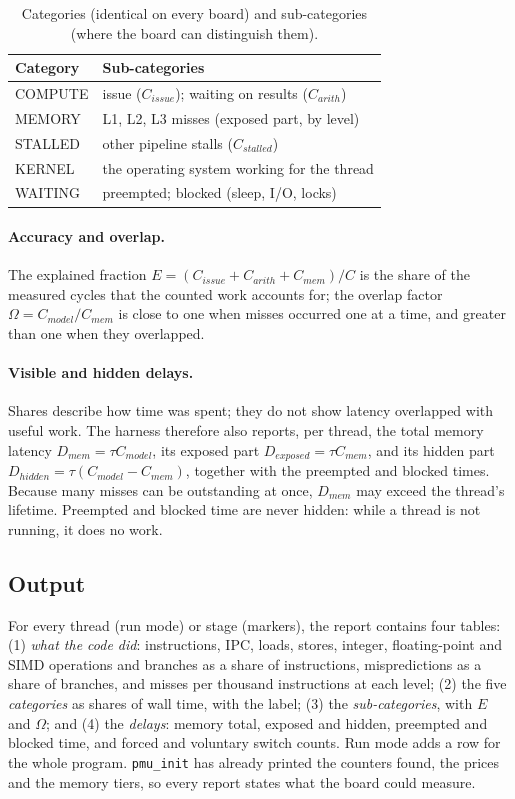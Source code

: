 \documentclass[10pt,a4paper,twocolumn]{article}
\newcommand{\code}[1]{\texttt{\small #1}}
\begin{document}
\begin{table}[t]
\centering\footnotesize
\caption{Categories (identical on every board) and sub-categories (where the board can distinguish them).}
\label{tab:cats}
\begin{tabularx}{\columnwidth}{|>{\raggedright\arraybackslash}p{1.45cm}|L|}
\hline
\textbf{Category} & \textbf{Sub-categories} \\ \hline
COMPUTE & issue ($C_{issue}$); waiting on results ($C_{arith}$) \\ \hline
MEMORY & L1, L2, L3 misses (exposed part, by level) \\ \hline
STALLED & other pipeline stalls ($C_{stalled}$) \\ \hline
KERNEL & the operating system working for the thread \\ \hline
WAITING & preempted; blocked (sleep, I/O, locks) \\ \hline
\end{tabularx}
\end{table}

\paragraph{Accuracy and overlap.} The explained fraction $E=(C_{issue}+C_{arith}+C_{mem})/C$ is the share of the measured cycles that the counted work accounts for; the overlap factor $\Omega=C_{model}/C_{mem}$ is close to one when misses occurred one at a time, and greater than one when they overlapped.

\paragraph{Visible and hidden delays.} Shares describe how time was spent; they do not show latency overlapped with useful work. The harness therefore also reports, per thread, the total memory latency $D_{mem}=\tau C_{model}$, its exposed part $D_{exposed}=\tau C_{mem}$, and its hidden part $D_{hidden}=\tau(C_{model}-C_{mem})$, together with the preempted and blocked times. Because many misses can be outstanding at once, $D_{mem}$ may exceed the thread's lifetime. Preempted and blocked time are never hidden: while a thread is not running, it does no work.

\subsection{Output}
For every thread (run mode) or stage (markers), the report contains four tables: (1) \emph{what the code did}: instructions, IPC, loads, stores, integer, floating-point and SIMD operations and branches as a share of instructions, mispredictions as a share of branches, and misses per thousand instructions at each level; (2) the five \emph{categories} as shares of wall time, with the label; (3) the \emph{sub-categories}, with $E$ and $\Omega$; and (4) the \emph{delays}: memory total, exposed and hidden, preempted and blocked time, and forced and voluntary switch counts. Run mode adds a row for the whole program. \code{pmu\_init} has already printed the counters found, the prices and the memory tiers, so every report states what the board could measure.
\end{document}

